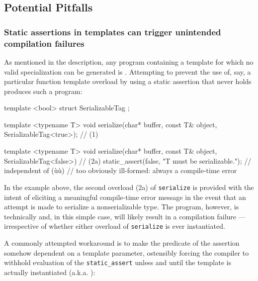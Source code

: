 \subsection[Potential Pitfalls]{Potential Pitfalls}\label{static-potential-pitfalls}

\subsubsection[Static assertions in templates can trigger unintended compilation failures]{Static assertions in templates can trigger unintended compilation failures}\label{static-assertions-in-templates-can-trigger-unintended-compilation-failures}

As mentioned in the description, any program containing a template for
which no valid specialization can be generated is
. Attempting to prevent the
use of, say, a particular function template overload by using a static
assertion that never holds produces such a program:

\begin{emcppslisting}[emcppserrorlines=10]
template <bool>
struct SerializableTag { };

template <typename T>
void serialize(char* buffer, const T& object, SerializableTag<true>);  // (1)

template <typename T>
void serialize(char* buffer, const T& object, SerializableTag<false>)  // (2a)
{
    static_assert(false, "T must be serializable.");  // independent of (ù{}ù)
        // too obviously ill-formed: always a compile-time error
}
\end{emcppslisting}

\noindent In the example above, the second overload (2a) of \lstinline!serialize! is
provided with the intent of eliciting a meaningful compile-time error
message in the event that an attempt is made to serialize a
nonserializable type. The program, however, is technically
 and, in this simple case, will likely result in a
compilation failure --- irrespective of whether either overload of
\lstinline!serialize! is ever instantiated.

A commonly attempted workaround
is to make the predicate of the assertion somehow dependent on a
template parameter, ostensibly forcing the compiler to withhold
evaluation of the \lstinline!static_assert! unless and until the template
is actually instantiated (a.k.a. ):

